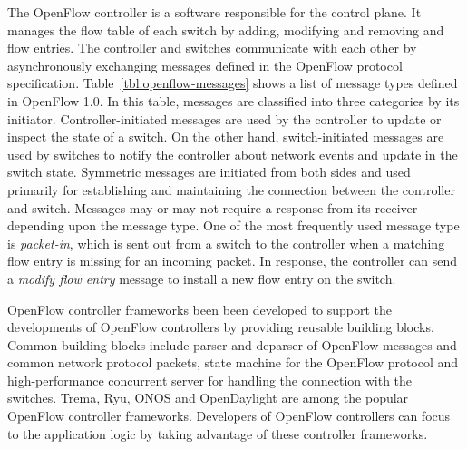 The OpenFlow controller is a software responsible for the control plane. It
manages the flow table of each switch by adding, modifying and removing and
flow entries. The controller and switches communicate with each other by
asynchronously exchanging messages defined in the OpenFlow protocol
specification.
Table~\ref{tbl:openflow-messages} shows a list of message types defined in
OpenFlow 1.0. In this table, messages are classified into three categories by
its initiator. Controller-initiated messages are used by the controller to
update or inspect the state of a switch. On the other hand, switch-initiated
messages are used by switches to notify the controller about network events
and update in the switch state. Symmetric messages are initiated from both
sides and used primarily for establishing and maintaining the connection between
the controller and switch. Messages may or may not require a response from its
receiver depending upon the message type. One of the most frequently used
message type is \emph{packet-in}, which is sent out from a switch to the
controller when a matching flow entry is missing for an incoming packet. In
response, the controller can send a \emph{modify flow entry} message to
install a new flow entry on the switch.

OpenFlow controller frameworks been been developed to support the developments
of OpenFlow controllers by providing reusable building blocks. Common building
blocks include parser and deparser of OpenFlow messages and common network
protocol packets, state machine for the OpenFlow protocol and high-performance
concurrent server for handling the connection with the switches.
Trema\cite{trema}, Ryu\cite{Ryu2014}, ONOS\cite{Berde2014} and
OpenDaylight\cite{Medved2014} are among the popular OpenFlow controller
frameworks. Developers of OpenFlow controllers can focus to the application
logic by taking advantage of these controller frameworks.

